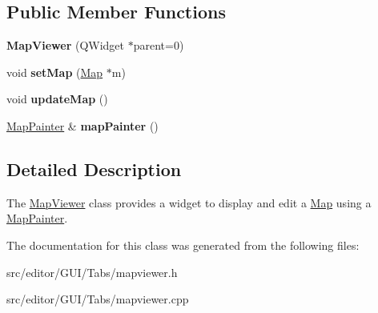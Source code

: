 \subsection*{\-Public \-Member \-Functions}
\begin{DoxyCompactItemize}
\item 
\hypertarget{class_map_viewer_ae2c78c6e6ac686b2db1f4b3a7e3f318a}{{\bfseries \-Map\-Viewer} (\-Q\-Widget $\ast$parent=0)}\label{class_map_viewer_ae2c78c6e6ac686b2db1f4b3a7e3f318a}

\item 
\hypertarget{class_map_viewer_a15df9bdd47e5ad36c67601d335bfa5f1}{void {\bfseries set\-Map} (\hyperlink{class_map}{\-Map} $\ast$m)}\label{class_map_viewer_a15df9bdd47e5ad36c67601d335bfa5f1}

\item 
\hypertarget{class_map_viewer_a723ad37abb7af9ecac0bdd68dd628e46}{void {\bfseries update\-Map} ()}\label{class_map_viewer_a723ad37abb7af9ecac0bdd68dd628e46}

\item 
\hypertarget{class_map_viewer_af30594b6df0ea90676a4dc4ec65abaca}{\hyperlink{class_map_painter}{\-Map\-Painter} \& {\bfseries map\-Painter} ()}\label{class_map_viewer_af30594b6df0ea90676a4dc4ec65abaca}

\end{DoxyCompactItemize}


\subsection{\-Detailed \-Description}
\-The \hyperlink{class_map_viewer}{\-Map\-Viewer} class provides a widget to display and edit a \hyperlink{class_map}{\-Map} using a \hyperlink{class_map_painter}{\-Map\-Painter}. 

\-The documentation for this class was generated from the following files\-:\begin{DoxyCompactItemize}
\item 
src/editor/\-G\-U\-I/\-Tabs/mapviewer.\-h\item 
src/editor/\-G\-U\-I/\-Tabs/mapviewer.\-cpp\end{DoxyCompactItemize}
